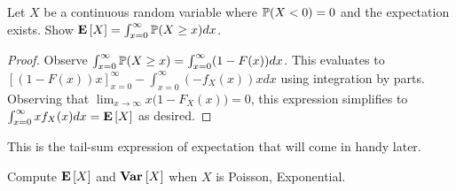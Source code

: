 \documentclass[10pt]{article}
\begin{document}
\setcounter{exercise}{6}
\begin{exercise}
    Let $X$ be a continuous random variable where $\P(X < 0) = 0$ and the
    expectation exists. Show $\E{X} = \int_{x=0}^{\infty} \P(X \geq x) dx$.
\end{exercise}

\begin{proof}
    Observe $\int_{x=0}^{\infty} \P(X \geq x) = \int_{x=0}^{\infty} (1 - F(x))
    dx$. This evaluates to $[(1-F(x))x]_{x=0}^{\infty} - \int_{x=0}^{\infty}
    (-f_X(x))x dx$ using integration by parts. Observing that $\lim_{x \to
        \infty} x\bigl( 1 - F_X(x) \bigr) = 0$, this expression simplifies to
        $\int_{x=0}^\infty x f_X(x) dx = \E{X}$ as desired.
\end{proof}

\begin{note}
    This is the tail-sum expression of expectation that will come in handy
    later.
\end{note}


\setcounter{exercise}{11}
\begin{exercise}
    Compute $\E{X}$ and $\Var{X}$ when $X$ is Poisson, Exponential.
\end{exercise}
\end{document}
